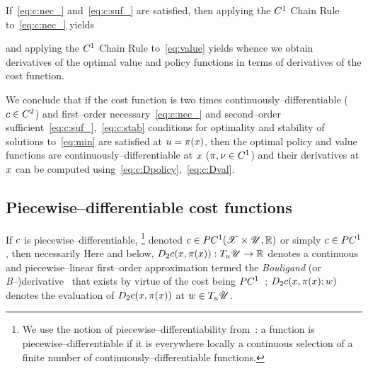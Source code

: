 \documentclass{article}
\begin{document}
If~\eqref{eq:c:nec_} and~\eqref{eq:c:suf_} are satisfied, then 
applying the $C^1$ Chain Rule~\citep[Prop.~C.3]{Lee2012-mb} to~\eqref{eq:c:nec_} yields

and applying the $C^1$ Chain Rule to~\eqref{eq:value} yields
\eqnn{\label{eq:c:Dval}
\D\val(\state) & = \D_\state \cost(\state,\policy(\state)) %
& = \D_1 \cost(\state,\policy(\state)) + \D_2 \cost(\state,\policy(\state)) \D\policy(\state),
}
whence we obtain derivatives of the optimal value and policy functions in terms of derivatives of the cost function.

We conclude that if the cost function is two times continuously--differentiable ($c\in C^2$) and first--order necessary~\eqref{eq:c:nec_} and second--order sufficient~\eqref{eq:c:suf_},~\eqref{eq:c:stab} conditions for optimality and stability of solutions to~\eqref{eq:min} are satisfied at $u = \pi(x)$, then the optimal policy and value functions are continuously--differentiable at $x$ ($\pi,\nu\in C^1$) and their derivatives at $x$ can be computed using~\eqref{eq:c:Dpolicy},~\eqref{eq:c:Dval}.



\subsection{Piecewise--differentiable cost functions}
\label{sec:value:pc}

If $c$ is piecewise--differentiable,%
\footnote{We use the notion of piecewise--differentiability from~\cite[Ch.~4.1]{Scholtes2012-la}: a function is piecewise--differentiable if it is everywhere locally a continuous selection of a finite number of continuously--differentiable functions.}
denoted $c\in PC^1(\mathscr{X}\times \mathscr{U},\mathbb{R})$ or simply $c\in PC^1$, then necessarily%
Here and below, 
$D_2 c(x,\pi(x)):T_u\mathscr{U}\rightarrow\mathbb{R}$ 
denotes a continuous and piecewise--linear first--order approximation termed the \emph{Bouligand} (or \emph{B--})derivative~\citep[Ch.~3]{Scholtes2012-la} that exists by virtue of the cost being $PC^1$~\citep[Lem.~4.1.3]{Scholtes2012-la}; 
$D_2 c(x,\pi(x);w)$ 
denotes the evaluation of
$D_2 c(x,\pi(x))$
at $w\in T_u\mathscr{U}$.
\end{document}
